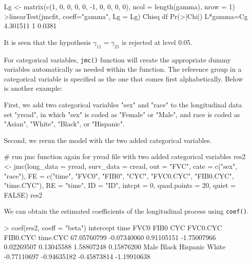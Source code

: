 \begin{example}
Lg <- matrix(c(1, 0, 0, 0, 0, -1, 0, 0, 0, 0), ncol = length(gamma), nrow = 1)
>linearTest(jmcfit, coeff="gamma", Lg = Lg)
              Chisq df Pr(>|Chi|)
L*gamma=Cg 4.301511  1 0.0381
\end{example}

It is seen that the hypothesis $\gamma_{11} = \gamma_{21}$ is rejected at level 0.05.

For categorical variables, \texttt{jmc()} function will create the appropriate dummy variables automatically as needed within the function. The reference group in a categorical variable is specified as the one that comes first alphabetically.  Below is another example:

First, we add two categorical variables "sex" and "race" to the longitudinal data set "yread", in which "sex" is coded as "Female" or "Male", and race is coded as "Asian", "White", "Black", or "Hispanic".


Second, we rerun the model with the two added categorical variables.

\begin{example}
# run jmc function again for yread file with two added categorical variables
res2 <- jmc(long_data = yread, surv_data = cread,
            out = "FVC", cate = c("sex", "race"),
            FE = c("time", "FVC0", "FIB0", "CYC", "FVC0.CYC",
                   "FIB0.CYC", "time.CYC"),
            RE = "time", ID = "ID", intcpt = 0,
            quad.points = 20, quiet = FALSE)
res2
\end{example}

We can obtain the estimated coefficients of the longitudinal process using \texttt{coef()}.

\begin{example}
> coef(res2, coeff = "beta")
  intercept        time        FVC0        FIB0         CYC    FVC0.CYC    FIB0.CYC    time.CYC
67.05760799 -0.07340060  0.91105151 -1.75007966  0.02269507  0.13045588  1.58807248  0.15876200
       Male       Black    Hispanic       White
-0.77110697 -0.94635182 -0.45873814 -1.19910638
\end{example}


